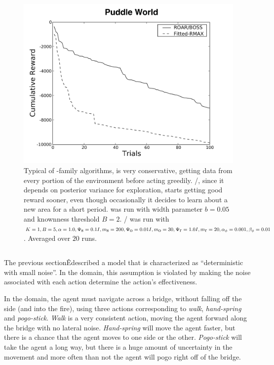 \begin{figure}[t]
\vskip 0.2in
\begin{center}
\centerline{\includegraphics[width=\columnwidth]{puddleFigure}}
\caption{Typical of -family algorithms,  is very conservative, getting data from every portion of the environment before acting greedily. /, since it depends on posterior variance for exploration, starts getting good reward sooner, even though occasionally it decides to learn about a new area for a short period.  was run with width parameter $b=0.05$ and knownness threshold $B=2$. / was run with $K=1, B=5, \alpha=1.0,\Psi_{\mbox s}=0.1I, m_{\mbox s}=200, \Psi_{\mbox o}=0.01I, m_{\mbox o}=30, \Psi_{\mbox r}=1.0I,m_{\mbox r}=20,\alpha_\phi=0.001,\beta_\phi=0.01$. Averaged over $20$ runs.}
\label{fig:puddle}
\end{center}
\vskip -0.2in
\end{figure} 


\subsection{}
\label{fire}

The previous sectionÊdescribed a model that is characterized as ``deterministic with small noise''. In the  domain, this assumption is violated by making the noise associated with each action determine the action's effectiveness.

In the  domain, the agent must navigate across a bridge, without falling off the side (and into the fire), using three actions corresponding to \emph{walk}, \emph{hand-spring} and \emph{pogo-stick}. \emph{Walk} is a very consistent action, moving the agent forward along the bridge with no lateral noise. \emph{Hand-spring} will move the agent faster, but there is a chance that the agent moves to one side or the other. \emph{Pogo-stick} will take the agent a long way, but there is a huge amount of uncertainty in the movement and more often than not the agent will pogo right off of the bridge.

